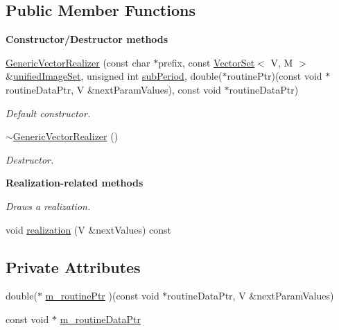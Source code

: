 \subsection*{Public Member Functions}
\begin{Indent}{\bf Constructor/\-Destructor methods}\par
\begin{DoxyCompactItemize}
\item 
\hyperlink{class_q_u_e_s_o_1_1_generic_vector_realizer_add5488cecf1f1f0779d056012ada18d8}{Generic\-Vector\-Realizer} (const char $\ast$prefix, const \hyperlink{class_q_u_e_s_o_1_1_vector_set}{Vector\-Set}$<$ V, M $>$ \&\hyperlink{class_q_u_e_s_o_1_1_base_vector_realizer_ad958991bab8d6369e8a0d66b22a237d4}{unified\-Image\-Set}, unsigned int \hyperlink{class_q_u_e_s_o_1_1_base_vector_realizer_ad9fda59efacf5bd84c472c96dfa00613}{sub\-Period}, double($\ast$routine\-Ptr)(const void $\ast$routine\-Data\-Ptr, V \&next\-Param\-Values), const void $\ast$routine\-Data\-Ptr)
\begin{DoxyCompactList}\small\item\em Default constructor. \end{DoxyCompactList}\item 
\hyperlink{class_q_u_e_s_o_1_1_generic_vector_realizer_a0daa8ba5bde1dc77da5c9f784bd76cd1}{$\sim$\-Generic\-Vector\-Realizer} ()
\begin{DoxyCompactList}\small\item\em Destructor. \end{DoxyCompactList}\end{DoxyCompactItemize}
\end{Indent}
\begin{Indent}{\bf Realization-\/related methods}\par
{\em Draws a realization. }\begin{DoxyCompactItemize}
\item 
void \hyperlink{class_q_u_e_s_o_1_1_generic_vector_realizer_aeb79c966ab4e20b22f75acc6b7068925}{realization} (V \&next\-Values) const 
\end{DoxyCompactItemize}
\end{Indent}
\subsection*{Private Attributes}
\begin{DoxyCompactItemize}
\item 
double($\ast$ \hyperlink{class_q_u_e_s_o_1_1_generic_vector_realizer_a913da22606696da4831afc3ef47a3a76}{m\-\_\-routine\-Ptr} )(const void $\ast$routine\-Data\-Ptr, V \&next\-Param\-Values)
\item 
const void $\ast$ \hyperlink{class_q_u_e_s_o_1_1_generic_vector_realizer_ad2c00300197c0a97bc43b55ea25c16cd}{m\-\_\-routine\-Data\-Ptr}
\end{DoxyCompactItemize}
